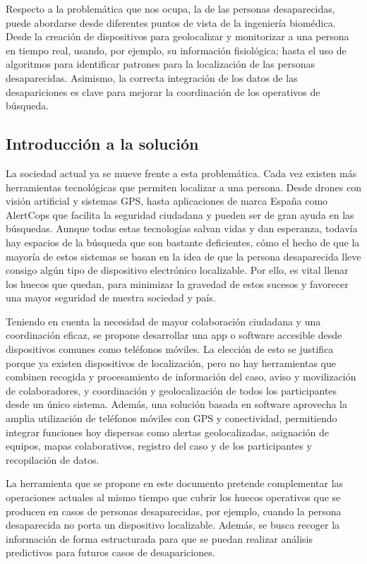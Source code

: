     Respecto a la problemática que nos ocupa, la de las personas desaparecidas, puede abordarse desde diferentes puntos de vista de la ingeniería biomédica. Desde la creación de dispositivos para geolocalizar y monitorizar a una persona en tiempo real, usando, por ejemplo, su información fisiológica; hasta el uso de algoritmos para identificar patrones para la localización de las personas desaparecidas. Asimismo, la correcta integración de los datos de las desapariciones es clave para mejorar la coordinación de los operativos de búsqueda.

    \subsection{Introducción a la solución}
    La sociedad actual ya se mueve frente a esta problemática. Cada vez existen más herramientas tecnológicas que permiten localizar a una persona. Desde drones con visión artificial y sistemas GPS, hasta aplicaciones de marca España como AlertCops que facilita la seguridad ciudadana y pueden ser de gran ayuda en las búsquedas. Aunque todas estas tecnologías salvan vidas y dan esperanza, todavía hay espacios de la búsqueda que son bastante deficientes, cómo el hecho de que la mayoría de estos sistemas se basan en la idea de que la persona desaparecida lleve consigo algún tipo de dispositivo electrónico localizable. Por ello, es vital llenar los huecos que quedan, para minimizar la gravedad de estos sucesos y favorecer una mayor seguridad de nuestra sociedad y país. 
    
    Teniendo en cuenta la necesidad de mayor colaboración ciudadana y una coordinación eficaz, se propone desarrollar una app o software accesible desde dispositivos comunes como teléfonos móviles. La elección de esto se justifica porque ya existen dispositivos de localización, pero no hay herramientas que combinen recogida y procesamiento de información del caso, aviso y movilización de colaboradores, y coordinación y geolocalización de todos los participantes desde un único sistema. Además, una solución basada en software aprovecha la amplia utilización de teléfonos móviles con GPS y conectividad, permitiendo integrar funciones hoy dispersas como alertas geolocalizadas, asignación de equipos, mapas colaborativos, registro del caso y de los participantes y recopilación de datos.
    
    La herramienta que se propone en este documento pretende complementar las operaciones actuales al mismo tiempo que cubrir los huecos operativos que se producen en casos de personas desaparecidas, por ejemplo, cuando la persona desaparecida no porta un dispositivo localizable. Además, se busca recoger la información de forma estructurada para que se puedan realizar análisis predictivos para futuros casos de desapariciones. 
        
